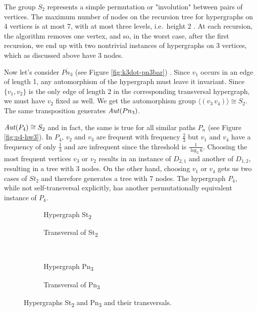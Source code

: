The group $S_2$ represents a simple permutation or "involution" between pairs of vertices. The maximum number of nodes on the \FKA{} recursion tree for hypergraphs on 4 vertices is at most 7, with at most three levels, i.e.\ height 2 . At each recursion, the algorithm removes one vertex, and so, in the worst case, after the first recursion, we end up with two nontrivial instances of hypergraphs on 3 vertices, which as discussed above have 3 nodes.

Now let's consider $\overline{Pn_3}$ (see Figure \ref{fig:k3dot-pn3bar}) . Since $v_1$ occurs in an edge of length 1, any automorphism of the hypergraph must leave it invariant. Since $\{v_1,v_2\}$ is the only edge of length 2 in the corresponding transversal hypergraph, we must have $v_2$ fixed as well. We get the automorphism group $\langle(v_3\,v_4)\rangle\cong S_2$. The same transposition generates $\mathit{Aut}(Pn_3)$.

$\mathit{Aut}(P_4)\cong S_2$ and in fact, the same is true for all similar paths $P_n$ (see Figure \ref{fig:p4-hw3}). In $P_4$, $v_2$ and $v_3$ are frequent with frequency $\frac{2}{3}$ but $v_1$ and $v_4$ have a frequency of only $\frac{1}{3}$ and are infrequent since the threshold is $\frac{1}{\log_2 6}$. Choosing the most frequent vertices $v_3$ or $v_2$ results in an instance of $D_{2,1}$ and another of $D_{1,2}$, resulting in a tree with 3 nodes. On the other hand, choosing $v_1$ or $v_4$ gets us two cases of $St_2$ and therefore generates a tree with 7 nodes. The hypergraph $P_4$, while not self-transversal explicitly, has another permutationally equivalent instance of $P_4$.

\begin{figure}[tp]
\centering
\begin{subfigure}{0.45\linewidth}\centering\caption{Hypergraph St\textsubscript{2}}\end{subfigure}\hfill
\begin{subfigure}{0.45\linewidth}\centering\caption{Transversal of St\textsubscript{2}}\end{subfigure}\\[8pt]
\begin{subfigure}{0.45\linewidth}\centering\caption{Hypergraph Pn\textsubscript{3}}\end{subfigure}\hfill
\begin{subfigure}{0.45\linewidth}\centering\caption{Transversal of Pn\textsubscript{3}}\end{subfigure}
\caption{Hypergraphs St\textsubscript{2} and Pn\textsubscript{3} and their transversals.}\label{fig:st2-pn3}
\end{figure}

